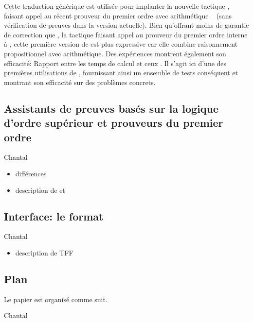 Cette traduction générique est utilisée pour implanter la nouvelle
tactique \beagletac, faisant appel au récent prouveur du premier ordre
avec arithmétique \beagle~\cite{DBLP:conf/cade/BaumgartnerW13} (sans
vérification de preuves dans la version actuelle). Bien qu'offrant moins
de garantie de correction que \metistac, la tactique faisant appel au
prouveur du premier ordre interne à \holfour, cette première version de
\beagletac est plus expressive car elle combine raisonnement
propositionnel avec arithmétique. Des expériences montrent également son
efficacité: \todo Rapport entre les temps de calcul \beagletac et ceux
\metistac. Il s'agit ici d'une des premières utilisations de \beagle,
fournissant ainsi un ensemble de tests conséquent et montrant son
efficacité sur des problèmes concrets.


\subsection{Assistants de preuves basés sur la logique d'ordre supérieur
et prouveurs du premier ordre}

\todo Chantal

\begin{itemize}
\item différences
\item description de \holfour et \beagle
\end{itemize}


\subsection{Interface: le format \tff}

\todo Chantal

\begin{itemize}
\item description de TFF
\end{itemize}


\subsection{Plan}

Le papier est organisé comme suit.

\todo Chantal
